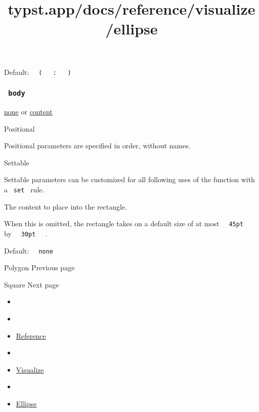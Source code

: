 Default:
\texttt{\ }{\texttt{\ (\ }}\texttt{\ }{\texttt{\ :\ }}\texttt{\ }{\texttt{\ )\ }}\texttt{\ }

\subsubsection{\texorpdfstring{\texttt{\ body\ }}{ body }}\label{parameters-body}

\href{/docs/reference/foundations/none/}{none} {or}
\href{/docs/reference/foundations/content/}{content}

{{ Positional }}

\label{parameters-body-positional-tooltip}
Positional parameters are specified in order, without names.

{{ Settable }}

\label{parameters-body-settable-tooltip}
Settable parameters can be customized for all following uses of the
function with a \texttt{\ set\ } rule.

The content to place into the rectangle.

When this is omitted, the rectangle takes on a default size of at most
\texttt{\ }{\texttt{\ 45pt\ }}\texttt{\ } by
\texttt{\ }{\texttt{\ 30pt\ }}\texttt{\ } .

Default: \texttt{\ }{\texttt{\ none\ }}\texttt{\ }

\href{/docs/reference/visualize/polygon/}{\pandocbounded{}}

{ Polygon } { Previous page }

\href{/docs/reference/visualize/square/}{\pandocbounded{}}

{ Square } { Next page }


\title{typst.app/docs/reference/visualize/ellipse}

\begin{itemize}
\tightlist
\item
  \href{/docs}{}
\item
  
\item
  \href{/docs/reference/}{Reference}
\item
  
\item
  \href{/docs/reference/visualize/}{Visualize}
\item
  
\item
  \href{/docs/reference/visualize/ellipse/}{Ellipse}
\end{itemize}

